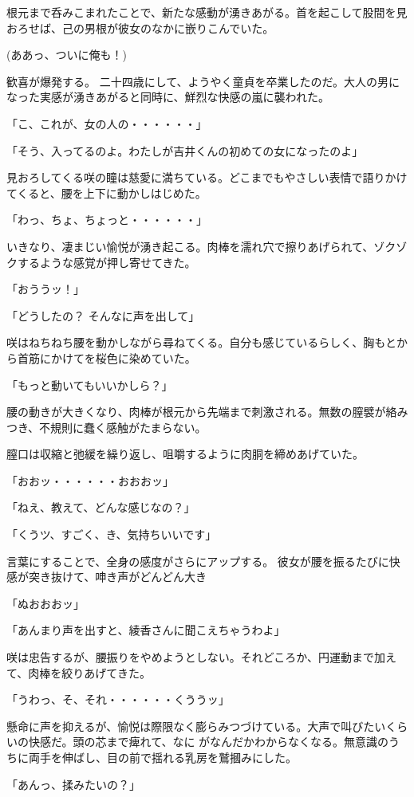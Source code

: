 ﻿\documentclass[book,tate]{jlreq}
\begin{document}
根元まで呑みこまれたことで、新たな感動が湧きあがる。首を起こして股間を見おろせば、己の男根が彼女のなかに嵌りこんでいた。

(ああっ、ついに俺も！)

歓喜が爆発する。 二十四歳にして、ようやく童貞を卒業したのだ。大人の男になった実感が湧きあがると同時に、鮮烈な快感の嵐に襲われた。

「こ、これが、女の人の・・・・・・」

「そう、入ってるのよ。わたしが吉井くんの初めての女になったのよ」

見おろしてくる咲の瞳は慈愛に満ちている。どこまでもやさしい表情で語りかけてくると、腰を上下に動かしはじめた。

「わっ、ちょ、ちょっと・・・・・・」

いきなり、凄まじい愉悦が湧き起こる。肉棒を濡れ穴で擦りあげられて、ゾクゾクするような感覚が押し寄せてきた。

「おううッ！」

「どうしたの？ そんなに声を出して」

咲はねちねち腰を動かしながら尋ねてくる。自分も感じているらしく、胸もとから首筋にかけてを桜色に染めていた。

「もっと動いてもいいかしら？」

腰の動きが大きくなり、肉棒が根元から先端まで刺激される。無数の膣襞が絡みつき、不規則に蠢く感触がたまらない。

膣口は収縮と弛緩を繰り返し、咀嚼するように肉胴を締めあげていた。

「おおッ・・・・・・おおおッ」

「ねえ、教えて、どんな感じなの？」

「くうツ、すごく、き、気持ちいいです」

言葉にすることで、全身の感度がさらにアップする。 彼女が腰を振るたびに快感が突き抜けて、呻き声がどんどん大き

「ぬおおおッ」

「あんまり声を出すと、綾香さんに聞こえちゃうわよ」

咲は忠告するが、腰振りをやめようとしない。それどころか、円運動まで加えて、肉棒を絞りあげてきた。

「うわっ、そ、それ・・・・・・くううッ」

懸命に声を抑えるが、愉悦は際限なく膨らみつづけている。大声で叫びたいくらいの快感だ。頭の芯まで痺れて、なに がなんだかわからなくなる。無意識のうちに両手を伸ばし、目の前で揺れる乳房を鷲摑みにした。

「あんっ、揉みたいの？」
\end{document}
